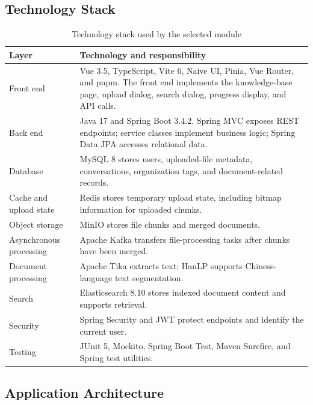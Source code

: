 \documentclass[11pt,a4paper]{article}
\begin{document}
\subsection{Technology Stack}

\begin{table}[htbp]
\centering
\caption{Technology stack used by the selected module}
\begin{tabularx}{\textwidth}{@{}lX@{}}
\toprule
\textbf{Layer} & \textbf{Technology and responsibility} \\
\midrule
Front end &
Vue 3.5, TypeScript, Vite 6, Naive UI, Pinia, Vue Router, and pnpm. The front end
implements the knowledge-base page, upload dialog, search dialog, progress display,
and API calls. \\
Back end &
Java 17 and Spring Boot 3.4.2. Spring MVC exposes REST endpoints; service classes
implement business logic; Spring Data JPA accesses relational data. \\
Database &
MySQL 8 stores users, uploaded-file metadata, conversations, organization tags, and
document-related records. \\
Cache and upload state &
Redis stores temporary upload state, including bitmap information for uploaded chunks. \\
Object storage &
MinIO stores file chunks and merged documents. \\
Asynchronous processing &
Apache Kafka transfers file-processing tasks after chunks have been merged. \\
Document processing &
Apache Tika extracts text; HanLP supports Chinese-language text segmentation. \\
Search &
Elasticsearch 8.10 stores indexed document content and supports retrieval. \\
Security &
Spring Security and JWT protect endpoints and identify the current user. \\
Testing &
JUnit 5, Mockito, Spring Boot Test, Maven Surefire, and Spring test utilities. \\
\bottomrule
\end{tabularx}
\end{table}

\subsection{Application Architecture}
\end{document}
